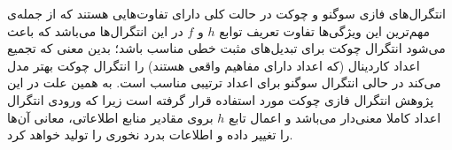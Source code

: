 انتگرال‌های فازی سوگنو و چوکت در حالت کلی دارای تفاوت‌هایی هستند که از جمله‌ی مهم‌ترین این ویژگی‌ها تفاوت تعریف توابع $h$ و $f$ در این انتگرال‌ها می‌باشد که باعث می‌شود انتگرال چوکت برای تبدیل‌های مثبت خطی مناسب باشد؛ بدین معنی که تجمیع اعداد کاردینال (که اعداد دارای مفاهیم واقعی هستند) را انتگرال چوکت بهتر مدل می‌کند در حالی انتگرال سوگنو برای اعداد ترتیبی مناسب است. به همین علت در این پژوهش انتگرال فازی چوکت مورد استفاده قرار گرفته است زیرا که ورودی انتگرال اعداد کاملا معنی‌دار می‌باشد و اعمال تابع $h$ بروی مقادیر منابع اطلاعاتی، معانی آن‌ها را تغییر داده و اطلاعات بدرد نخوری را تولید خواهد کرد.